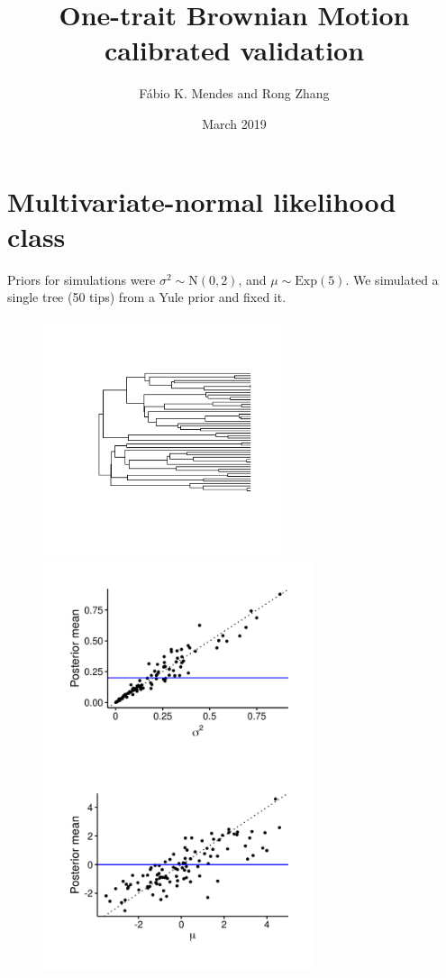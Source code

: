 \documentclass{article}
\title{One-trait Brownian Motion calibrated validation}
\author{F\'{a}bio K. Mendes and Rong Zhang}
\date{March 2019}
\begin{document}
\maketitle

\newpage

\section{Multivariate-normal likelihood class}

Priors for simulations were $\sigma^2 \sim \text{N}(0, 2)$, and $\mu \sim \text{Exp}(5)$. We simulated a single tree (50 tips) from a Yule prior and fixed it.

\begin{figure}[!ht]
  \begin{minipage}[c]{.4\textwidth}
    \centering
    \includegraphics[width=7cm]{../BMMVN_ultra_tree.png}
  \end{minipage}
  \hfill
  \begin{minipage}{.5\textwidth}
    \centering
    \includegraphics[width=8cm]{../BMMVN_ultra_graphs.png}
  \end{minipage}
\end{figure}
\end{document}
